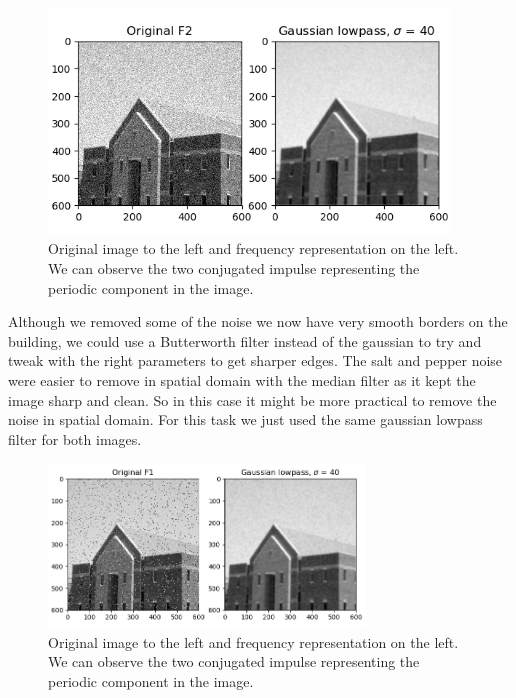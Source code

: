 {\begin{figure}[!htb]
    {\centering
        \includegraphics[width=0.95\textwidth]{task4gauss.png}
        \caption{Original image to the left and frequency representation on the left. We can observe the two conjugated impulse representing the periodic component in the image.}
        \label{task4gauss}
    \par}
    \end{figure}

    Although we removed some of the noise we now have very smooth borders on the building, we could use a Butterworth filter instead of the gaussian to try and tweak with the right parameters to get sharper edges. The salt and pepper noise were easier to remove in spatial domain with the median filter as it kept the image sharp and clean. So in this case it might be more practical to remove the noise in spatial domain. For this task we just used the same gaussian lowpass filter for both images.

    \begin{figure}[H]
        {\centering
            \includegraphics[width=0.75\textwidth]{task4pepper.png}
            \caption{Original image to the left and frequency representation on the left. We can observe the two conjugated impulse representing the periodic component in the image.}
            \label{task4pepper}
        \par}
        \end{figure}

}

